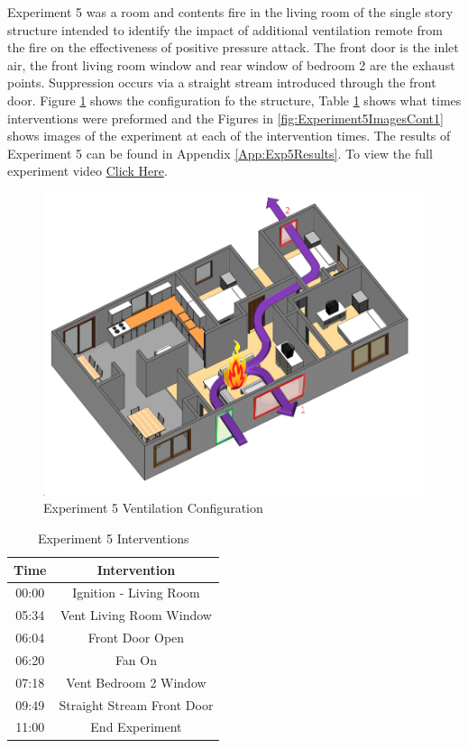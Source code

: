 \documentclass{article}
\begin{document}
Experiment 5 was a room and contents fire in the living room of the single story structure intended to identify the impact of additional ventilation remote from the fire on the effectiveness of positive pressure attack. The front door is the inlet air, the front living room window and rear window of bedroom 2 are the exhaust points. Suppression occurs via a straight stream introduced through the front door. Figure \ref{fig:Exp5VentConfig} shows the configuration fo the structure, Table \ref{Table:Exp5Interventions} shows what times interventions were preformed and the Figures in \ref{fig:Experiment5ImagesCont1} shows images of the experiment at each of the intervention times. The results of Experiment 5 can be found in Appendix \ref{App:Exp5Results}. To view the full experiment video \href{https://youtu.be/IezjGcmbLqU}{Click Here}.

\begin{figure}[H]
	\centering
	\includegraphics[width=5in]{0_Images/FireExperiments/Single_Story/Experiment_5.jpg}
	\caption{Experiment 5 Ventilation Configuration}
	\label{fig:Exp5VentConfig}
\end{figure}

\begin{table}[H]
	\centering
	\caption{Experiment 5 Interventions}
	\begin{tabular}{|c|c|} 
		\hline
		Time & Intervention \\ \hline \hline
		00:00 & Ignition - Living Room \\ \hline
		05:34 & Vent Living Room Window \\ \hline
		06:04 & Front Door Open \\ \hline
		06:20 & Fan On \\ \hline
		07:18 & Vent Bedroom 2 Window \\ \hline
		09:49 & Straight Stream Front Door \\ \hline
		11:00 & End Experiment \\ \hline
	\end{tabular}
	\label{Table:Exp5Interventions}
\end{table}
\end{document}
